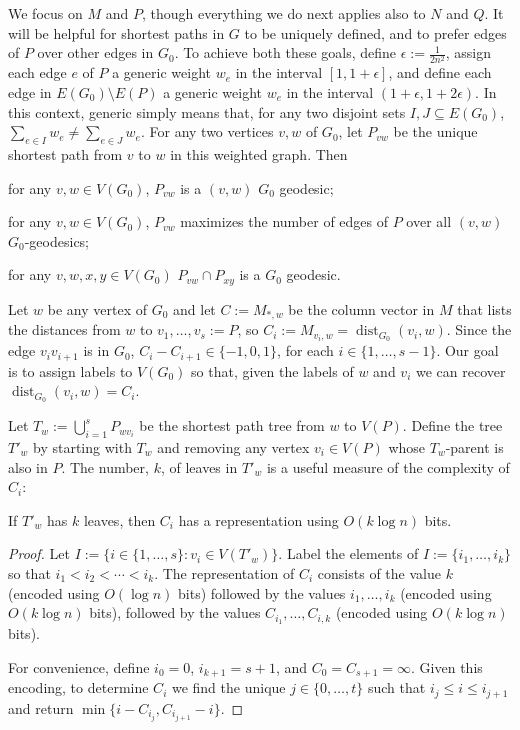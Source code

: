 \documentclass{patmorin}
\DeclareMathOperator{\dist}{dist}
\begin{document}
We focus on $M$ and $P$, though everything we do next applies also to $N$ and $Q$.  It will be helpful for shortest paths in $G$ to be uniquely defined, and to prefer edges of $P$ over other edges in $G_0$.  To achieve both these goals, define $\epsilon := \tfrac{1}{2n^2}$, assign each edge $e$ of $P$ a generic weight $w_e$ in the interval $[1,1+\epsilon]$, and define each edge in $E(G_0)\setminus E(P)$ a generic weight $w_e$ in the interval $(1+\epsilon,1+2\epsilon)$.  In this context, generic simply means that, for any two disjoint sets $I,J\subseteq E(G_0)$, $\sum_{e\in I}w_e\neq \sum_{e\in J}w_e$.  For any two vertices $v,w$ of $G_0$, let $P_{vw}$ be the unique shortest path from $v$ to $w$ in this weighted graph.  Then
\begin{inparaenum}[(i)]
    \item for any $v,w\in V(G_0)$, $P_{vw}$ is a $(v,w)$ $G_0$ geodesic;
    \item for any $v,w\in V(G_0)$, $P_{vw}$ maximizes the number of edges of $P$ over all $(v,w)$ $G_0$-geodesics;
    \item for any $v,w,x,y\in V(G_0)$ $P_{vw}\cap P_{xy}$ is a $G_0$ geodesic.
\end{inparaenum}

Let $w$ be any vertex of $G_0$ and let $C:=M_{*,w}$ be the column vector in $M$ that lists the distances from $w$ to $v_1,\ldots,v_s:=P$, so $C_i:=M_{v_i,w}=\dist_{G_0}(v_i,w)$.   Since the edge $v_iv_{i+1}$ is in $G_0$, $C_i-C_{i+1}\in\{-1,0,1\}$, for each $i\in\{1,\ldots,s-1\}$.  Our goal is to assign labels to $V(G_0)$ so that, given the labels of $w$ and $v_i$ we can recover $\dist_{G_0}(v_i,w)=C_i$.

Let $T_w:=\bigcup_{i=1}^s P_{wv_i}$ be the shortest path tree from $w$ to $V(P)$.  Define the tree $T'_w$ by starting with $T_w$ and removing any vertex $v_i\in V(P)$ whose $T_w$-parent is also in $P$.  The number, $k$, of leaves in $T'_w$ is a useful measure of the complexity of $C_i$:

\begin{lem}
    If $T'_w$ has $k$ leaves, then $C_i$ has a representation using $O(k\log n)$ bits.
\end{lem}

\begin{proof}
    Let $I:=\{i\in\{1,\ldots,s\}: v_i\in V(T'_w)\}$. Label the elements of $I:=\{i_1,\ldots,i_k\}$ so that $i_1<i_2<\cdots<i_k$.  The representation of $C_i$ consists of the value $k$ (encoded using $O(\log n)$ bits) followed by the values $i_1,\ldots,i_k$ (encoded using $O(k\log n)$ bits), followed by the values $C_{i_1},\ldots,C_{i,k}$ (encoded using $O(k\log n)$ bits).

    For convenience, define $i_0=0$, $i_{k+1}=s+1$, and $C_{0}=C_{s+1}=\infty$.
    Given this encoding, to determine $C_i$ we find the unique $j\in\{0,\ldots,t\}$ such that $i_j\le i\le i_{j+1}$ and return $\min\{i-C_{i_j}, C_{i_{j+1}}-i\}$.
\end{proof}
\end{document}
